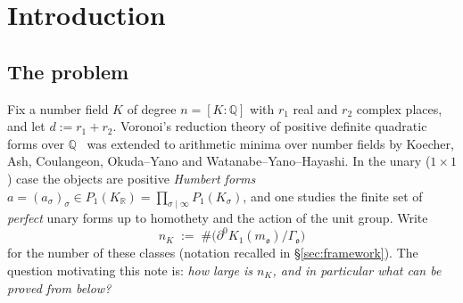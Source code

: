 \documentclass[11pt,reqno]{amsart}
\theoremstyle{plain}
\theoremstyle{definition}
\newcommand{\Z}{\mathbb{Z}}
\newcommand{\Q}{\mathbb{Q}}
\newcommand{\R}{\mathbb{R}}
\newcommand{\Nm}{\operatorname{Nm}}
\newcommand{\Reg}{\operatorname{Reg}}
\newcommand{\Ok}{\mathfrak{o}}
\newcommand{\bdy}{\partial}
\newcommand{\nK}{n_K}
\begin{document}
\begin{abstract}
Three further results relate perfect forms to other objects. First, relative minima link the squared
sail to the Klein sails of the lattice $\Ok$: by theorems of Bykovskii and German, every relative minimum is a sail
vertex or a special point on a triangular facet. Combined with Euler's formula on the sail tori, this shows
that the numbers of vertices and facets of the Klein sails modulo units are also $\asymp\Reg_\Ok$ up to a
factor $(\log D_\Ok)^2$, and that $\nK\le2\ell_\Ok$, where $\ell_\Ok$ is the number of relative minima
modulo units. This is the cubic counterpart of Yasaki's bound $h_d\le\ell_d$. Second, we determine when
Leibak's bound $\gamma_K^m\le\gamma_m^mD_K$ for the Hermite--Humbert constant is attained. For a real
quadratic field this happens exactly when $\mathcal O_K$ has a $\Z$--basis $u,v$ with
$\Nm(u)+\Nm(v)+\Nm(u-v)=0$, and for a totally real cubic field it forces $2\mathcal O_K=\mathfrak p\mathfrak q^2$.
Third, an integral perfect form whose minimal vectors are units is the cubic lattice $I_3$, and its
functional generates the codifferent. Combined with Euler's formula on the totally positive sail, this shows
that in no totally real cubic field are all additively indecomposable integers squares of units.
\end{abstract}

\maketitle

\section{Introduction}

\subsection{The problem}
Fix a number field $K$ of degree $n=[K:\Q]$ with $r_1$ real and $r_2$ complex places, and let
$d:=r_1+r_2$. Voronoi's reduction theory of positive definite quadratic forms over $\Q$~\cite{Voronoi} was extended to
arithmetic minima over number fields by Koecher, Ash, Coulangeon, Okuda--Yano and Watanabe--Yano--Hayashi.
In the unary ($1\times1$) case the objects are positive \emph{Humbert forms}
$a=(a_\sigma)_\sigma\in P_1(K_\R)=\prod_{\sigma\mid\infty}P_1(K_\sigma)$, and one studies the finite set of
\emph{perfect} unary forms up to homothety and the action of the unit group. Write
\[
\nK \;:=\; \#\big(\bdy^0K_1(m_\Ok)/\Gamma_\Ok\big)
\]
for the number of these classes (notation recalled in \S\ref{sec:framework}). The question motivating this
note is: \emph{how large is $\nK$, and in particular what can be proved from below?}
\end{document}
